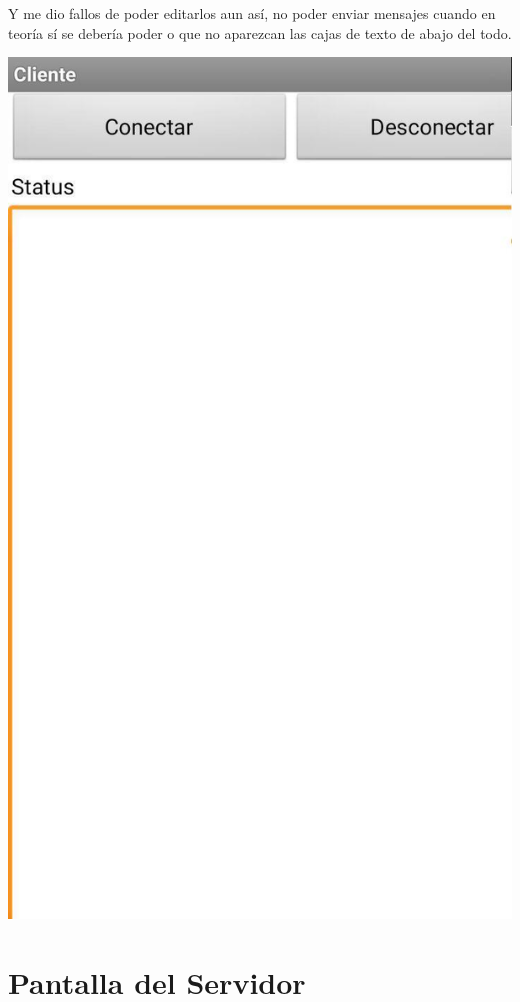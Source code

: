 \documentclass{article}
\begin{document}
Y me dio fallos de poder editarlos aun así, no poder enviar mensajes cuando en teoría sí se debería poder o que no aparezcan las cajas de texto de abajo del todo.

\begin{flushleft}
	\includegraphics[scale=0.3]{imagenes/CFallo.jpg} 
\end{flushleft}

\section{Pantalla del Servidor}
\end{document}

